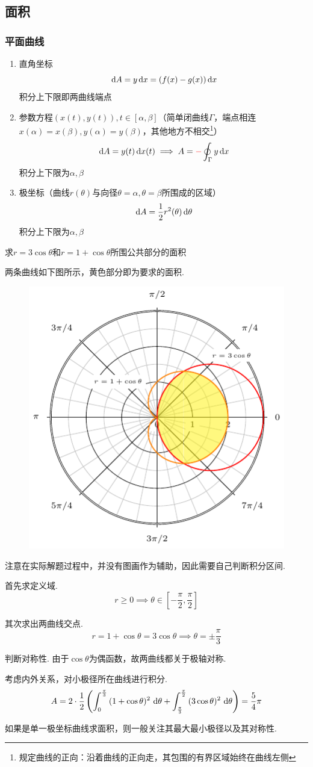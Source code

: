 \subsection{面积}
\subsubsection{平面曲线}
\begin{enumerate}
	\item 直角坐标
	\[\,\mathrm{d} A=y\,\mathrm{d} x=(f(x)-g(x))\,\mathrm{d} x\]
	积分上下限即两曲线端点
	\item 参数方程$(x(t),y(t)),t\in[\alpha,\beta]$（简单闭曲线$\Gamma$，端点相连$x(\alpha)=x(\beta),y(\alpha)=y(\beta)$，其他地方不相交\footnote{规定曲线的正向：沿着曲线的正向走，其包围的有界区域始终在曲线左侧}）
	\[\,\mathrm{d} A=y(t)\,\mathrm{d} x(t)\implies A=\textcolor{red}{-}\oint_\Gamma y\,\mathrm{d} x\]
	积分上下限为$\alpha,\beta$
	\item 极坐标（曲线$r(\theta)$与向径$\theta=\alpha,\theta=\beta$所围成的区域）
	\[\,\mathrm{d} A=\dfrac{1}{2}r^2(\theta)\,\mathrm{d}\theta\]
	积分上下限为$\alpha,\beta$
\end{enumerate}
\begin{example}
求$r=3\cos\theta$和$r=1+\cos\theta$所围公共部分的面积
\end{example}
\begin{analysis}
两条曲线如下图所示，黄色部分即为要求的面积.
\begin{figure}[H]
\centering
\includegraphics[width=0.35\linewidth]{fig/polar_example.pdf}
\end{figure}
\par 注意在实际解题过程中，并没有图画作为辅助，因此需要自己判断积分区间.
\par 首先求定义域.
\[r\geq 0 \implies \theta\in[-\dfrac{\pi}{2},\dfrac{\pi}{2}]\]
\par 其次求出两曲线交点.
\[r=1+\cos\theta=3\cos\theta\implies\theta=\pm\dfrac{\pi}{3}\]
\par 判断对称性.
由于$\cos\theta$为偶函数，故两曲线都关于极轴对称.
\par 考虑内外关系，对小极径所在曲线进行积分.
\[A=2\cdot\dfrac{1}{2}\left(\displaystyle\int_{0}^{\frac{\pi}{3}}{(1+\cos\theta)^2}\,\,\mathrm{d} \theta+\displaystyle\int_{\frac{\pi}{3}}^{\frac{\pi}{2}}{(3\cos\theta)^2}\,\,\mathrm{d} \theta\right)=\dfrac{5}{4}\pi\]
\end{analysis}
\par 如果是单一极坐标曲线求面积，则一般关注其最大最小极径以及其对称性.

